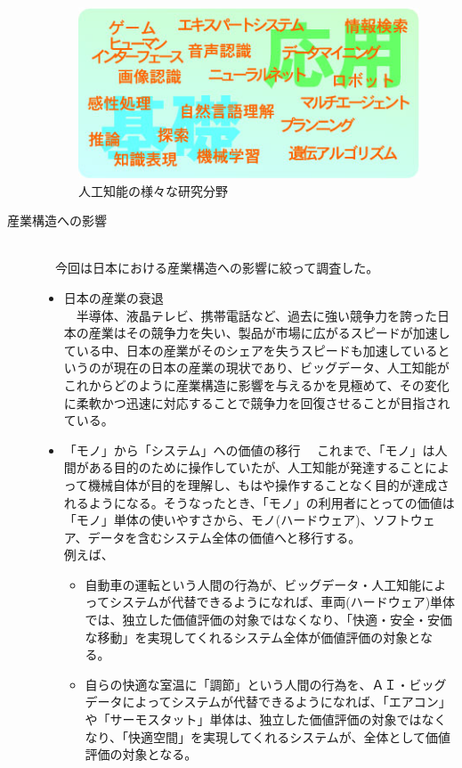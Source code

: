 \documentclass[a4paper,12pt]{jarticle}
\begin{document}
\begin{description}
  \begin{figure}[H]
   \begin{center}
    \includegraphics[width=150truemm]{AI.jpg}
    \caption{人工知能の様々な研究分野}
    \label{AIPicture}
   \end{center}
  \end{figure}
\newpage
 \item[産業構造への影響]\mbox\\\\
　今回は日本における産業構造への影響に絞って調査した。
 \begin{itemize}
  \item 日本の産業の衰退\\
　半導体、液晶テレビ、携帯電話など、過去に強い競争力を誇った日本の産業はその競争力を失い、製品が市場に広がるスピードが加速している中、日本の産業がそのシェアを失うスピードも加速しているというのが現在の日本の産業の現状であり、ビッグデータ、人工知能がこれからどのように産業構造に影響を与えるかを見極めて、その変化に柔軟かつ迅速に対応することで競争力を回復させることが目指されている。
  \item 「モノ」から「システム」への価値の移行
　これまで、「モノ」は人間がある目的のために操作していたが、人工知能が発達することによって機械自体が目的を理解し、もはや操作することなく目的が達成されるようになる。そうなったとき、「モノ」の利用者にとっての価値は「モノ」単体の使いやすさから、モノ(ハードウェア)、ソフトウェア、データを含むシステム全体の価値へと移行する。\\
例えば、
   \begin{itemize}
    \item 自動車の運転という人間の行為が、ビッグデータ・人工知能によってシステムが代替できるようになれば、車両(ハードウェア)単体では、独立した価値評価の対象ではなくなり、「快適・安全・安価な移動」を実現してくれるシステム全体が価値評価の対象となる。
    \item 自らの快適な室温に「調節」という人間の行為を、ＡＩ・ビッグデータによってシステムが代替できるようになれば、「エアコン」や「サーモスタット」単体は、独立した価値評価の対象ではなくなり、「快適空間」を実現してくれるシステムが、全体として価値評価の対象となる。

\end{itemize}
\end{itemize}
\end{description}
\end{document}
